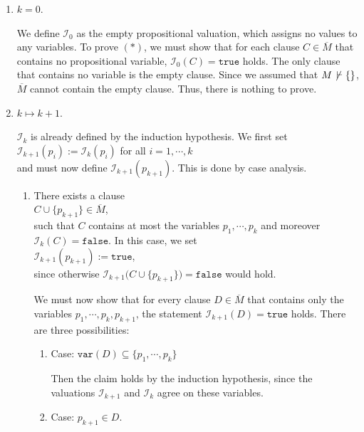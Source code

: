 \begin{enumerate}
\item[I.A.:] $k=0$.
 
  We define $\mathcal{I}_0$ as the empty propositional valuation, which assigns no
  values to any variables. To prove $(*)$, we must show that for each clause $C \in \overline{M}$ that contains
  no propositional variable, $\mathcal{I}_0(C) = \mathtt{true}$ holds. The only clause that contains
  no variable is the empty clause. Since we assumed that $M \not\,\vdash \{\}$,
  $\overline{M}$ cannot contain the empty clause. Thus, there is nothing to prove.
\item[I.S.:] $k \mapsto k+1$.

  $\mathcal{I}_k$ is already defined by the induction hypothesis. We first set
  \\[0.2cm]
  \hspace*{1.3cm}
  $\mathcal{I}_{k+1}(p_i) := \mathcal{I}_k(p_i)$ \quad for all $i=1,\cdots,k$
  \\[0.2cm]
  and must now define $\mathcal{I}_{k+1}(p_{k+1})$. This is done by case analysis.
  \begin{enumerate}
  \item There exists a clause
    \\[0.2cm]
    \hspace*{1.3cm}
    $C \cup \{p_{k+1}\} \in \overline{M}$,
    \\[0.2cm]
    such that $C$ contains at most the variables $p_1,\cdots,p_k$ and moreover $\mathcal{I}_k(C) = \mathtt{false}$.
    In this case, we set
    \\[0.2cm]
    \hspace*{1.3cm}
    $\mathcal{I}_{k+1}(p_{k+1}) := \mathtt{true}$,
    \\[0.2cm]    
    since otherwise $\mathcal{I}_{k+1}\bigl(C \cup \{p_{k+1}\}\bigr) = \mathtt{false}$ would hold. 

    We must now show that for every clause $D \in \overline{M}$ that contains only the variables \linebreak
    $p_1,\cdots,p_k,p_{k+1}$, the statement $\mathcal{I}_{k+1}(D) = \mathtt{true}$ holds. There are three
    possibilities:
    \begin{enumerate}[1.]
    \item Case: $\mathtt{var}(D) \subseteq \{p_1,\cdots,p_k\}$

          Then the claim holds by the induction hypothesis, since the valuations
          $\mathcal{I}_{k+1}$ and $\mathcal{I}_k$ agree on these variables.
    \item Case: $p_{k+1} \in D$.
          

\end{enumerate}
\end{enumerate}
\end{enumerate}
